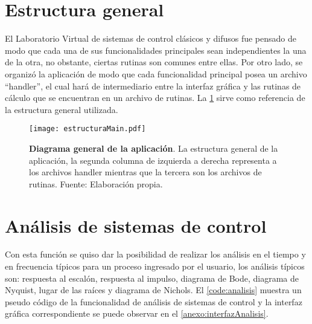 \section{Estructura general}

    El Laboratorio Virtual de sistemas de control clásicos y difusos fue pensado de modo que cada una de sus funcionalidades principales sean independientes la una de la otra, no obstante, ciertas rutinas son comunes entre ellas. Por otro lado, se organizó la aplicación de modo que cada funcionalidad principal posea un archivo \enquote{handler}, el cual hará de intermediario entre la interfaz gráfica y las rutinas de cálculo que se encuentran en un archivo de rutinas. La \cref{fig:estructuraMain} sirve como referencia de la estructura general utilizada.

    \begin{figure}[htb]
        \centering
        \texttt{[image: estructuraMain.pdf]}
        \caption[Diagrama general de la aplicación]{\textbf{Diagrama general de la aplicación}. La estructura general de la aplicación, la segunda columna de izquierda a derecha representa a los archivos handler mientras que la tercera son los archivos de rutinas. Fuente: Elaboración propia.} 
        \label{fig:estructuraMain}
    \end{figure}

\section{Análisis de sistemas de control}
    
    Con esta función se quiso dar la posibilidad de realizar los análisis en el tiempo y en frecuencia típicos para un proceso ingresado por el usuario, los análisis típicos son: respuesta al escalón, respuesta al impulso, diagrama de Bode, diagrama de Nyquist, lugar de las raíces y diagrama de Nichols. El \cref{code:analisis} muestra un pseudo código de la funcionalidad de análisis de sistemas de control y la interfaz gráfica correspondiente se puede observar en el \ref{anexo:interfazAnalisis}.

